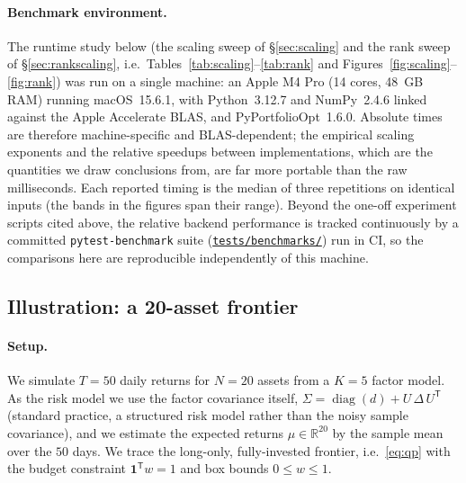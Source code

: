 \documentclass[11pt]{article}
\newcommand{\R}{\mathbb{R}}
\newcommand{\Sig}{\Sigma}
\newcommand{\trans}{^{\mathsf{T}}}
\newcommand{\repourl}{https://github.com/cvxgrp/cvxcla}
\newcommand{\srcref}{v1.8.1}
\newcommand{\srcfile}[2]{\href{\repourl/blob/\srcref/#1}{\texttt{#2}}}
\begin{document}
\paragraph{Benchmark environment.}
The runtime study below (the scaling sweep of \S\ref{sec:scaling} and the rank
sweep of \S\ref{sec:rankscaling}, i.e.\ Tables~\ref{tab:scaling}--\ref{tab:rank}
and Figures~\ref{fig:scaling}--\ref{fig:rank}) was run on a single machine: an
Apple M4 Pro (14 cores, 48~GB RAM) running macOS~15.6.1, with Python~3.12.7 and
NumPy~2.4.6 linked against the Apple Accelerate BLAS, and PyPortfolioOpt~1.6.0.
Absolute times are therefore machine-specific and BLAS-dependent; the empirical
scaling exponents and the relative speedups between implementations, which are
the quantities we draw conclusions from, are far more portable than the raw
milliseconds. Each reported timing is the median of three repetitions on identical
inputs (the bands in the figures span their range). Beyond the one-off experiment
scripts cited above, the relative backend performance is tracked continuously by a
committed \texttt{pytest-benchmark} suite
(\srcfile{tests/benchmarks/test_backend_scaling.py}{tests/benchmarks/}) run in CI,
so the comparisons here are reproducible independently of this machine.

\subsection{Illustration: a 20-asset frontier}

\paragraph{Setup.}
We simulate $T = 50$ daily returns for $N = 20$ assets from a $K = 5$ factor
model. As the risk model we use the factor covariance itself,
$\Sig = \operatorname{diag}(d) + U\,\Delta\,U\trans$ (standard practice, a
structured risk model rather than the noisy sample covariance), and we estimate
the expected returns $\mu \in \R^{20}$ by the sample mean over the $50$ days.
We trace the long-only, fully-invested frontier, i.e.\ \eqref{eq:qp} with the
budget constraint $\mathbf{1}\trans w = 1$ and box bounds $0 \le w \le 1$.
\end{document}
